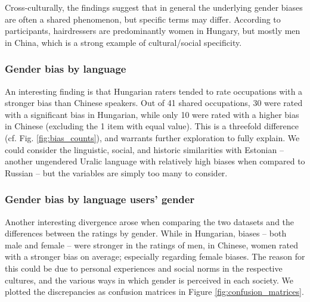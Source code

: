 \documentclass[11pt]{article}
\begin{document}
Cross-culturally, the findings suggest that in general the underlying gender biases are often a shared phenomenon, but specific terms may differ. According to participants, hairdressers are predominantly women in Hungary, but mostly men in China, which is a strong example of cultural/social specificity.

\subsubsection{Gender bias by language}

An interesting finding is that Hungarian raters tended to rate occupations with a stronger bias than Chinese speakers. Out of 41 shared occupations, 30 were rated with a significant bias in Hungarian, while only 10 were rated with a higher bias in Chinese (excluding the 1 item with equal value). This is a threefold difference (cf. Fig. \ref{fig:bias_counts}), and warrants further exploration to fully explain. We could consider the linguistic, social, and historic similarities with Estonian -- another ungendered Uralic language with relatively high biases when compared to Russian \citep{kaukonen_2025_gender} -- but the variables are simply too many to consider. 


\subsubsection{Gender bias by language users' gender}

Another interesting divergence arose when comparing the two datasets and the differences between the ratings by gender. While in Hungarian, biases -- both male and female -- were stronger in the ratings of men, in Chinese, women rated with a stronger bias on average; especially regarding female biases. The reason for this could be due to personal experiences and social norms in the respective cultures, and the various ways in which gender is perceived in each society. We plotted the discrepancies as confusion matrices in Figure \ref{fig:confusion_matrices}.

\end{document}
